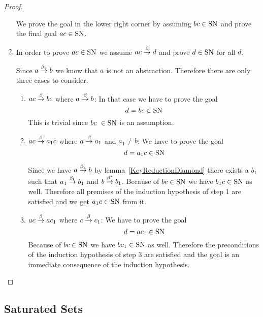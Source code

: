 \begin{theorem}
\begin{proof}
\begin{enumerate}
            We prove the goal in the lower right corner by assuming $bc \in \SN$
                and prove the final goal $ac \in \text{SN}$.

        \item In order to prove $ac \in \text{SN}$ we assume $ac \stackrel{\beta}{\to} d$ and prove
            $d \in \text{SN}$ for all $d$.

            Since $a \stackrel{\beta_{\text{k}}}{\to} b$ we know that $a$ is not an abstraction.
            Therefore there are only three cases to consider.
            \begin{enumerate}
            \item $ac \stackrel{\beta}{\to} bc$ where $a \stackrel{\beta}{\to} b$: In that case we have to
                prove the goal
                $$
                    d = bc \in \text{SN}
                $$
                This is trivial since $bc \in \SN$ is an assumption.

            \item $ac \stackrel{\beta}{\to} a_1c$ where $a \stackrel{\beta}{\to} a_1$ and $a_1 \ne b$: We
                have to prove the goal
                $$
                    d = a_1 c \in \text{SN}
                $$

                Since we have $a \stackrel{\beta_{\text{k}}}{\to} b$ by
                lemma~\ref{KeyReductionDiamond} there exists a $b_1$ such
                that $a_1 \stackrel{\beta_{\text{k}}}{\to} b_1$ and $b \stackrel{\beta^*}{\to} b_1$. Because of
                $bc \in \SN$ we have $b_1c \in \text{SN}$ as well. Therefore all
                premises of the induction hypothesis of step 1 are satisfied and
                we get $a_1 c \in \text{SN}$ from it.

            \item $ac \stackrel{\beta}{\to} ac_1$ where $c \stackrel{\beta}{\to} c_1$: We have to prove the
                goal
                $$
                    d = a c_1 \in \text{SN}
                $$
                Because of $bc \in \SN$ we have $bc_1 \in \text{SN}$ as well.
                    Therefore the preconditions of the induction hypothesis of
                    step 3 are satisfied and the goal is an immediate
                    consequence of the induction hypothesis.
            \end{enumerate}
        \end{enumerate}
    \end{proof}
\end{theorem}








\subsection{Saturated Sets}


